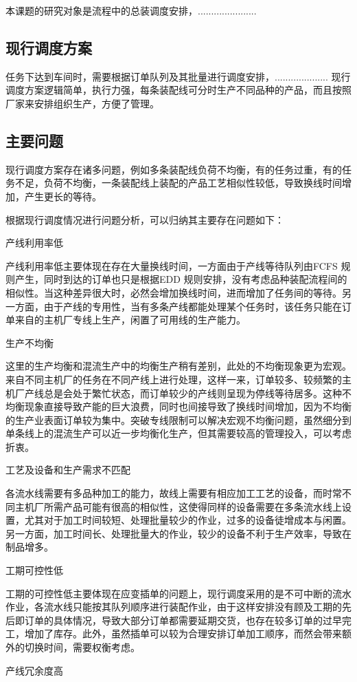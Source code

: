 本课题的研究对象是流程中的总装调度安排，......................
\subsection{现行调度方案}
任务下达到车间时，需要根据订单队列及其批量进行调度安排，....................
现行调度方案逻辑简单，执行力强，每条装配线可分时生产不同品种的产品，而且按照厂家来安排组织生产，方便了管理。
\subsection{主要问题}
现行调度方案存在诸多问题，例如多条装配线负荷不均衡，有的任务过重，有的任务不足，负荷不均衡，一条装配线上装配的产品工艺相似性较低，导致换线时间增加，产生更长的等待。

根据现行调度情况进行问题分析，可以归纳其主要存在问题如下：
\renewcommand{\labelenumi}{(\theenumi)}
\begin{asparaenum}
\item 产线利用率低

产线利用率低主要体现在存在大量换线时间，一方面由于产线等待队列由FCFS 规则产生，同时到达的订单也只是根据EDD 规则安排，没有考虑品种装配流程间的相似性。当这种差异很大时，必然会增加换线时间，进而增加了任务间的等待。另一方面，由于产线的专用性，当有多条产线都能处理某个任务时，该任务只能在订单来自的主机厂专线上生产，闲置了可用线的生产能力。
\item 生产不均衡

这里的生产均衡和混流生产中的均衡生产稍有差别，此处的不均衡现象更为宏观。来自不同主机厂的任务在不同产线上进行处理，这样一来，订单较多、较频繁的主机厂产线总是会处于繁忙状态，而订单较少的产线则呈现为停线等待居多。这种不均衡现象直接导致产能的巨大浪费，同时也间接导致了换线时间增加，因为不均衡的生产业表面订单较为集中。突破专线限制可以解决宏观不均衡问题，虽然细分到单条线上的混流生产可以近一步均衡化生产，但其需要较高的管理投入，可以考虑折衷。
\item 工艺及设备和生产需求不匹配

各流水线需要有多品种加工的能力，故线上需要有相应加工工艺的设备，而时常不同主机厂所需产品可能有很高的相似性，这使得同样的设备需要在多条流水线上设置，尤其对于加工时间较短、处理批量较少的作业，过多的设备徒增成本与闲置。另一方面，加工时间长、处理批量大的作业，较少的设备不利于生产效率，导致在制品增多。
\item 工期可控性低

工期的可控性低主要体现在应变插单的问题上，现行调度采用的是不可中断的流水作业，各流水线只能按其队列顺序进行装配作业，由于这样安排没有顾及工期的先后即订单的具体情况，导致大部分订单都需要延期交货，也存在较多订单的过早完工，增加了库存。此外，虽然插单可以较为合理安排订单加工顺序，而然会带来额外的切换时间，需要权衡考虑。
\item 产线冗余度高
\end{asparaenum}

